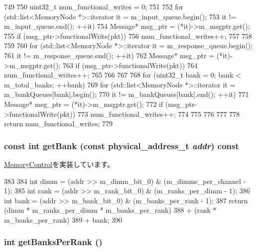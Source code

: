 \begin{DoxyCode}
749 {
750     uint32_t num_functional_writes = 0;
751 
752     for (std::list<MemoryNode *>::iterator it = m_input_queue.begin();
753          it != m_input_queue.end(); ++it) {
754         Message* msg_ptr = (*it)->m_msgptr.get();
755         if (msg_ptr->functionalWrite(pkt)) {
756             num_functional_writes++;
757         }
758     }
759 
760     for (std::list<MemoryNode *>::iterator it = m_response_queue.begin();
761          it != m_response_queue.end(); ++it) {
762         Message* msg_ptr = (*it)->m_msgptr.get();
763         if (msg_ptr->functionalWrite(pkt)) {
764             num_functional_writes++;
765         }
766     }
767 
768     for (uint32_t bank = 0; bank < m_total_banks; ++bank) {
769         for (std::list<MemoryNode *>::iterator it = m_bankQueues[bank].begin();
770              it != m_bankQueues[bank].end(); ++it) {
771             Message* msg_ptr = (*it)->m_msgptr.get();
772             if (msg_ptr->functionalWrite(pkt)) {
773                 num_functional_writes++;
774             }
775         }
776     }
777 
778     return num_functional_writes;
779 }
\end{DoxyCode}
\hypertarget{classRubyMemoryControl_a26f571eb9a81a077295b54c2ed398aea}{
\subsubsection[{getBank}]{\setlength{\rightskip}{0pt plus 5cm}const int getBank (const {\bf physical\_\-address\_\-t} {\em addr}) const}}
\label{classRubyMemoryControl_a26f571eb9a81a077295b54c2ed398aea}


\hyperlink{classMemoryControl_a7a4691e15d68d8bf9df636adff2c964f}{MemoryControl}を実装しています。


\begin{DoxyCode}
383 {
384     int dimm = (addr >> m_dimm_bit_0) & (m_dimms_per_channel - 1);
385     int rank = (addr >> m_rank_bit_0) & (m_ranks_per_dimm - 1);
386     int bank = (addr >> m_bank_bit_0) & (m_banks_per_rank - 1);
387     return (dimm * m_ranks_per_dimm * m_banks_per_rank)
388         + (rank * m_banks_per_rank)
389         + bank;
390 }
\end{DoxyCode}
\hypertarget{classRubyMemoryControl_aba6f6d5c066193ae70ee43153051055b}{
\subsubsection[{getBanksPerRank}]{\setlength{\rightskip}{0pt plus 5cm}int getBanksPerRank ()}}
\label{classRubyMemoryControl_aba6f6d5c066193ae70ee43153051055b}


